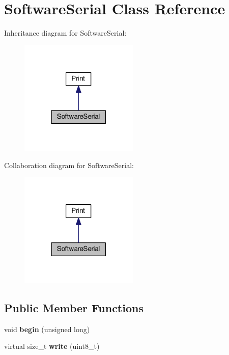 \hypertarget{class_software_serial}{}\section{Software\+Serial Class Reference}
\label{class_software_serial}


Inheritance diagram for Software\+Serial\+:
\nopagebreak
\begin{figure}[H]
\begin{center}
\leavevmode
\includegraphics[width=160pt]{class_software_serial__inherit__graph}
\end{center}
\end{figure}


Collaboration diagram for Software\+Serial\+:
\nopagebreak
\begin{figure}[H]
\begin{center}
\leavevmode
\includegraphics[width=160pt]{class_software_serial__coll__graph}
\end{center}
\end{figure}
\subsection*{Public Member Functions}
\begin{DoxyCompactItemize}
\item 
void {\bfseries begin} (unsigned long)\hypertarget{class_software_serial_a2c080b19d958967689c3fad7b6620844}{}\label{class_software_serial_a2c080b19d958967689c3fad7b6620844}

\item 
virtual size\+\_\+t {\bfseries write} (uint8\+\_\+t)\hypertarget{class_software_serial_a1481a56fb169a6529af6277bd87d39ac}{}\label{class_software_serial_a1481a56fb169a6529af6277bd87d39ac}

\end{DoxyCompactItemize}
